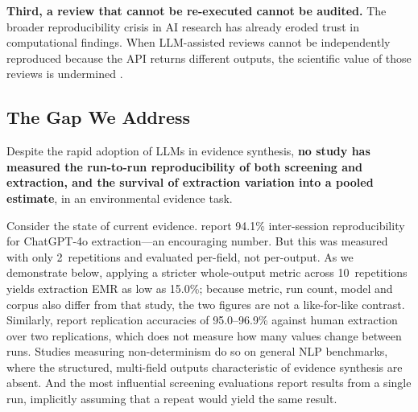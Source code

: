 \documentclass[preprint,review,12pt,authoryear]{elsarticle}
\begin{document}
\textbf{Third, a review that cannot be re-executed cannot be audited.}
The broader reproducibility crisis in AI research \citep{hutson2018science,haibe2020nature,kapoor2023leakage} has already eroded trust in computational findings.
When LLM-assisted reviews cannot be independently reproduced because the API returns different outputs, the scientific value of those reviews is undermined \citep{han2025biomedical,desai2025reproducibility,semmelrock2025barriers}.

\subsection{The Gap We Address}

Despite the rapid adoption of LLMs in evidence synthesis, \textbf{no study has measured the run-to-run reproducibility of both screening and extraction, and the survival of extraction variation into a pooled estimate}, in an environmental evidence task.

Consider the state of current evidence.
\citet{jensen2025chatgpt} report 94.1\% inter-session reproducibility for ChatGPT-4o extraction---an encouraging number.
But this was measured with only 2~repetitions and evaluated per-field, not per-output.
As we demonstrate below, applying a stricter whole-output metric across 10~repetitions yields extraction EMR as low as 15.0\%; because metric, run count, model and corpus also differ from that study, the two figures are not a like-for-like contrast.
Similarly, \citet{gartlehner2024extraction} report replication accuracies of 95.0--96.9\% against human extraction over two replications, which does not measure how many values change between runs.
Studies measuring non-determinism \citep{atil2024nondeterminism,klishevich2025codereview} do so on general NLP benchmarks, where the structured, multi-field outputs characteristic of evidence synthesis are absent.
And the most influential screening evaluations \citep{oami2024screening,khraisha2024gpt4,matsui2024screening} report results from a single run, implicitly assuming that a repeat would yield the same result.
\end{document}

